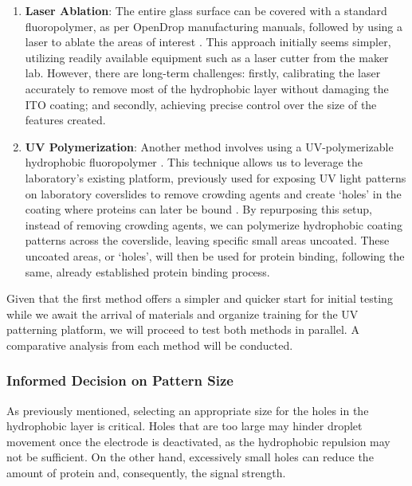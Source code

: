 \documentclass[8pt, twocolumn]{article}
\begin{document}
\begin{enumerate}
    \item \textbf{Laser Ablation}: The entire glass surface can be covered with a standard fluoropolymer, as per OpenDrop manufacturing manuals, followed by using a laser to ablate the areas of interest \cite{rodriguez-alabandaStudyMainInfluencing2019}. This approach initially seems simpler, utilizing readily available equipment such as a laser cutter from the maker lab. However, there are long-term challenges: firstly, calibrating the laser accurately to remove most of the hydrophobic layer without damaging the ITO coating; and secondly, achieving precise control over the size of the features created.
    
    \item \textbf{UV Polymerization}: Another method involves using a UV-polymerizable hydrophobic fluoropolymer \cite{CytoCryl3298}. This technique allows us to leverage the laboratory's existing platform, previously used for exposing UV light patterns on laboratory coverslides to remove crowding agents and create `holes' in the coating where proteins can later be bound \cite{straleMultiproteinPrintingLightInduced2016}. By repurposing this setup, instead of removing crowding agents, we can polymerize hydrophobic coating patterns across the coverslide, leaving specific small areas uncoated. These uncoated areas, or `holes', will then be used for protein binding, following the same, already established protein binding process.
\end{enumerate}

Given that the first method offers a simpler and quicker start for initial testing while we await the arrival of materials and organize training for the UV patterning platform, we will proceed to test both methods in parallel. A comparative analysis from each method will be conducted.

\subsubsection*{Informed Decision on Pattern Size}

As previously mentioned, selecting an appropriate size for the holes in the hydrophobic layer is critical. Holes that are too large may hinder droplet movement once the electrode is deactivated, as the hydrophobic repulsion may not be sufficient. On the other hand, excessively small holes can reduce the amount of protein and, consequently, the signal strength.
\end{document}
